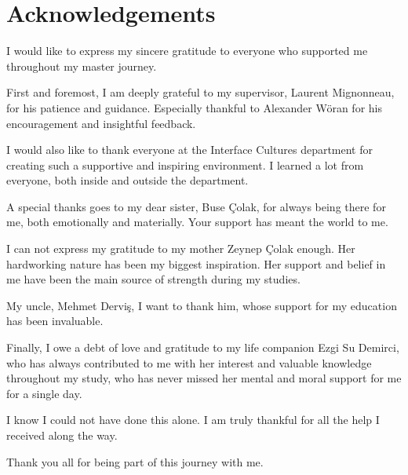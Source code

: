 \chapter*{Acknowledgements}
    I would like to express my sincere gratitude to everyone who supported me throughout my master journey.\par

    First and foremost, I am deeply grateful to my supervisor, Laurent Mignonneau, for his patience and guidance. Especially thankful to Alexander Wöran for his encouragement and insightful feedback.\par

    I would also like to thank everyone at the Interface Cultures department for creating such a supportive and inspiring environment. I learned a lot from everyone, both inside and outside the department.\par

    A special thanks goes to my dear sister, Buse Çolak, for always being there for me, both emotionally and materially. Your support has meant the world to me.\par

    I can not express my gratitude to my mother Zeynep Çolak enough. Her hardworking nature has been my biggest inspiration. Her support and belief in me have been the main source of strength during my studies.\par

    My uncle, Mehmet Derviş, I want to thank him, whose support for my education has been invaluable.\par

    Finally, I owe a debt of love and gratitude to my life companion Ezgi Su Demirci, who has always contributed to me with her interest and valuable knowledge throughout my study, who has never missed her mental and moral support for me for a single day.\par

    I know I could not have done this alone. I am truly thankful for all the help I received along the way.\par

    Thank you all for being part of this journey with me.\par